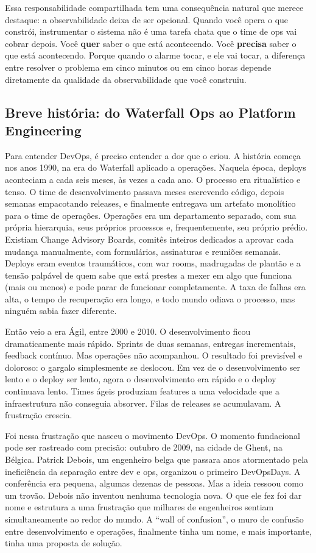 Essa responsabilidade compartilhada tem uma consequência natural que merece
destaque: a observabilidade deixa de ser opcional. Quando você opera o que constrói,
instrumentar o sistema não é uma tarefa chata que o time de ops vai cobrar depois.
Você \textbf{quer} saber o que está acontecendo. Você \textbf{precisa} saber o que
está acontecendo. Porque quando o alarme tocar, e ele vai tocar, a diferença
entre resolver o problema em cinco minutos ou em cinco horas depende diretamente
da qualidade da observabilidade que você construiu.

\subsection{Breve história: do Waterfall Ops ao Platform Engineering}

Para entender DevOps, é preciso entender a dor que o criou. A história começa
nos anos 1990, na era do Waterfall aplicado a operações. Naquela época, deploys
aconteciam a cada seis meses, às vezes a cada ano. O processo era ritualístico
e tenso. O time de desenvolvimento passava meses escrevendo código, depois semanas
empacotando releases, e finalmente entregava um artefato monolítico para o time de
operações. Operações era um departamento separado, com sua própria hierarquia, seus
próprios processos e, frequentemente, seu próprio prédio. Existiam Change Advisory
Boards, comitês inteiros dedicados a aprovar cada mudança manualmente, com
formulários, assinaturas e reuniões semanais. Deploys eram eventos traumáticos, com
war rooms, madrugadas de plantão e a tensão palpável de quem sabe que está prestes
a mexer em algo que funciona (mais ou menos) e pode parar de funcionar completamente.
A taxa de falhas era alta, o tempo de recuperação era longo, e todo mundo odiava
o processo, mas ninguém sabia fazer diferente.

Então veio a era Ágil, entre 2000 e 2010. O desenvolvimento ficou dramaticamente
mais rápido. Sprints de duas semanas, entregas incrementais, feedback contínuo.
Mas operações não acompanhou. O resultado foi previsível e doloroso: o gargalo
simplesmente se deslocou. Em vez de o desenvolvimento ser lento e o deploy ser
lento, agora o desenvolvimento era rápido e o deploy continuava lento. Times
ágeis produziam features a uma velocidade que a infraestrutura não conseguia
absorver. Filas de releases se acumulavam. A frustração crescia.

Foi nessa frustração que nasceu o movimento DevOps. O momento
fundacional pode ser rastreado com precisão: outubro de 2009, na cidade de Ghent,
na Bélgica. Patrick Debois, um engenheiro belga que passara anos atormentado pela
ineficiência da separação entre dev e ops, organizou o primeiro DevOpsDays. A
conferência era pequena, algumas dezenas de pessoas. Mas a ideia ressoou como
um trovão. Debois não inventou nenhuma tecnologia nova. O que ele fez foi dar nome
e estrutura a uma frustração que milhares de engenheiros sentiam simultaneamente ao
redor do mundo. A ``wall of confusion'', o muro de confusão entre desenvolvimento
e operações, finalmente tinha um nome, e mais importante, tinha uma proposta de
solução.

